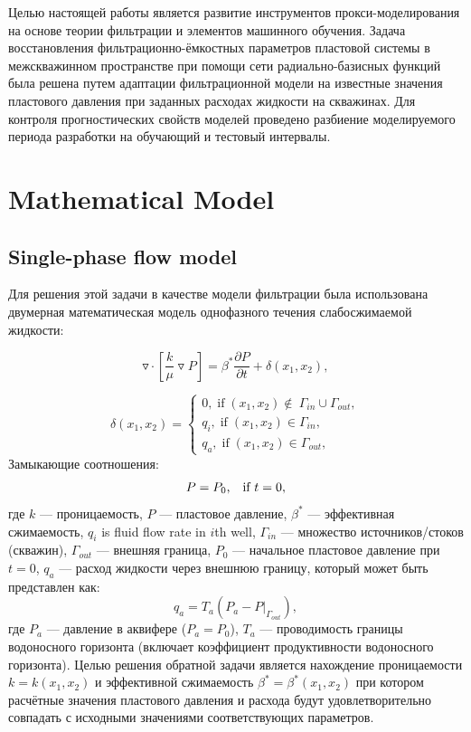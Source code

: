 \documentclass{article}
\begin{document}
Целью настоящей работы является развитие инструментов прокси-моделирования на основе теории фильтрации и элементов машинного обучения. Задача восстановления фильтрационно-ёмкостных параметров пластовой системы в межскважинном пространстве при помощи сети радиально-базисных функций была решена путем адаптации фильтрационной модели на известные значения пластового давления при заданных расходах жидкости на скважинах. Для контроля прогностических свойств моделей проведено разбиение моделируемого периода разработки на обучающий и тестовый интервалы.

\section{Mathematical Model}

\subsection{Single-phase flow model}
Для решения этой задачи в качестве модели фильтрации была использована двумерная математическая модель однофазного течения
слабосжимаемой жидкости:

\begin{equation} \label{fil}
	\triangledown \cdot \left[\frac{k}{\mu}\triangledown P \right] = \beta^* \frac{\partial P}{\partial t} + \delta(x_1,x_2),
\end{equation}

\begin{equation} \label{bc}
	\delta(x_1,x_2)  = \left\{\begin{array}{crl}
		0, \;\mbox{if}\;(x_1,x_2) \notin\ \Gamma_{in}\cup\Gamma_{out},\\
		q_{i}, \;\mbox{if}\;(x_1,x_2) \in \Gamma_{in},\\
		q_{a}, \;\mbox{if}\;(x_1,x_2) \in \Gamma_{out},
	\end{array}\right. 
\end{equation}
Замыкающие соотношения:
\begin{equation} \label{kr}
P = P_0\mbox{,\quad \mbox{if} $t=0$},
\end{equation}
где $k$ --- проницаемость, $P$ --- пластовое давление, $\beta^*$ --- эффективная сжимаемость, $q_i$ is fluid flow rate in $i$th well, $\Gamma_{in}$ --- множество источников/стоков (скважин), $\Gamma_{out}$ --- внешняя граница, $P_0$ --- начальное пластовое давление при $t=0$, $q_{a}$ --- расход жидкости через внешнюю  границу, который может быть представлен как:
\begin{equation*} \label{qaq}
	q_a = T_a(P_{a} - P|_{\Gamma_{out}}),
\end{equation*}
где $P_a$ --- давление в аквифере ($P_a = P_0$), $T_a$ --- 
проводимость границы водоносного горизонта (включает коэффициент продуктивности водоносного горизонта). Целью решения обратной задачи является нахождение проницаемости $k = k(x_1,x_2)$ и эффективной сжимаемость $\beta^* = \beta^*(x_1,x_2)$ при котором расчётные значения пластового давления и расхода будут удовлетворительно совпадать с исходными значениями соответствующих параметров.
\end{document}
